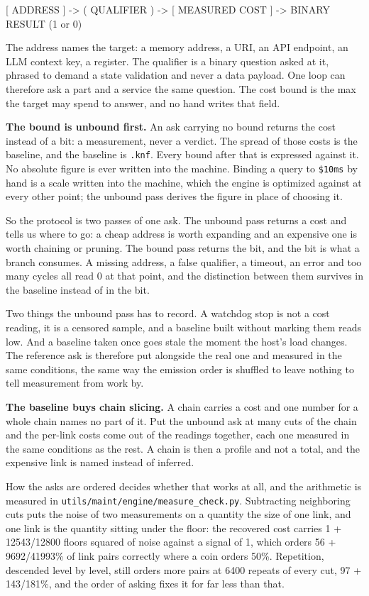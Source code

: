 [ ADDRESS ] -> ( QUALIFIER ) -> [ MEASURED COST ] -> BINARY RESULT (1 or 0)

The address names the target: a memory address, a URI, an API endpoint, an LLM context key, a register. The qualifier is a binary question asked at it, phrased to demand a state validation and never a data payload. One loop can therefore ask a part and a service the same question. The cost bound is the max the target may spend to answer, and no hand writes that field.

\textbf{The bound is unbound first.} An ask carrying no bound returns the cost instead of a bit: a measurement, never a verdict. The spread of those costs is the baseline, and the baseline is \texttt{.\allowbreak{}knf}. Every bound after that is expressed against it. No absolute figure is ever written into the machine. Binding a query to \texttt{\$10ms} by hand is a scale written into the machine, which the engine is optimized against at every other point; the unbound pass derives the figure in place of choosing it.

So the protocol is two passes of one ask. The unbound pass returns a cost and tells us where to go: a cheap address is worth expanding and an expensive one is worth chaining or pruning. The bound pass returns the bit, and the bit is what a branch consumes. A missing address, a false qualifier, a timeout, an error and too many cycles all read 0 at that point, and the distinction between them survives in the baseline instead of in the bit.

Two things the unbound pass has to record. A watchdog stop is not a cost reading, it is a censored sample, and a baseline built without marking them reads low. And a baseline taken once goes stale the moment the host's load changes. The reference ask is therefore put alongside the real one and measured in the same conditions, the same way the emission order is shuffled to leave nothing to tell measurement from work by.

\textbf{The baseline buys chain slicing.} A chain carries a cost and one number for a whole chain names no part of it. Put the unbound ask at many cuts of the chain and the per-link costs come out of the readings together, each one measured in the same conditions as the rest. A chain is then a profile and not a total, and the expensive link is named instead of inferred.

How the asks are ordered decides whether that works at all, and the arithmetic is measured in \texttt{utils/\allowbreak{}maint/\allowbreak{}engine/\allowbreak{}measure\_\allowbreak{}check.\allowbreak{}py}. Subtracting neighboring cuts puts the noise of two measurements on a quantity the size of one link, and one link is the quantity sitting under the floor: the recovered cost carries 1 + 12543/12800 floors squared of noise against a signal of 1, which orders 56 + 9692/41993\% of link pairs correctly where a coin orders 50\%. Repetition, descended level by level, still orders more pairs at 6400 repeats of every cut, 97 + 143/181\%, and the order of asking fixes it for far less than that.

